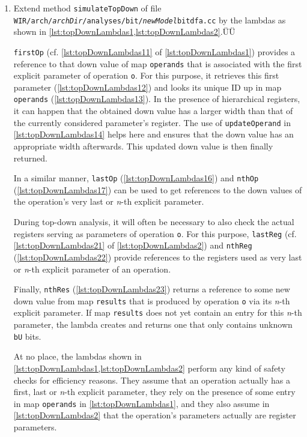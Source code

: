 \begin{enumerate}[resume]
  \item Extend method \texttt{simulateTopDown} of file \texttt{WIR/arch/{\itshape archDir}/analyses/bit/{\itshape newModel}bitdfa.cc} by the lambdas as shown in \cref{lst:topDownLambdas1,lst:topDownLambdas2}.Ü\label{enum:topDownLambdas}Ü

  \texttt{firstOp} (cf. \cref{lst:topDownLambdas11} of \cref{lst:topDownLambdas1}) provides a reference to that down value of map \texttt{operands} that is associated with the first explicit parameter of operation \texttt{o}.
  For this purpose, it retrieves this first parameter (\cref{lst:topDownLambdas12}) and looks its unique ID up in map \texttt{operands} (\cref{lst:topDownLambdas13}).
  In the presence of hierarchical registers, it can happen that the obtained down value has a larger width than that of the currently considered parameter's register.
  The use of \texttt{updateOperand} in \cref{lst:topDownLambdas14} helps here and ensures that the down value has an appropriate width afterwards.
  This updated down value is then finally returned.

  In a similar manner, \texttt{lastOp} (\cref{lst:topDownLambdas16}) and \texttt{nthOp} (\cref{lst:topDownLambdas17}) can be used to get references to the down values of the operation's very last or \emph{n}-th explicit parameter.

  During top-down analysis, it will often be necessary to also check the actual registers serving as parameters of operation \texttt{o}.
  For this purpose, \texttt{lastReg} (cf. \cref{lst:topDownLambdas21} of \cref{lst:topDownLambdas2}) and \texttt{nthReg} (\cref{lst:topDownLambdas22}) provide references to the registers used as very last or \emph{n}-th explicit parameter of an operation.

  Finally, \texttt{nthRes} (\cref{lst:topDownLambdas23}) returns a reference to some new down value from map \texttt{results} that is produced by operation \texttt{o} via its \emph{n}-th explicit parameter.
  If map \texttt{results} does not yet contain an entry for this \emph{n}-th parameter, the lambda creates and returns one that only contains unknown \texttt{bU} bits.
  \begin{wirWarn}
    At no place, the lambdas shown in \cref{lst:topDownLambdas1,lst:topDownLambdas2} perform any kind of safety checks for efficiency reasons.
    They assume that an operation actually has a first, last or \emph{n}-th explicit parameter, they rely on the presence of some entry in map \texttt{operands} in \cref{lst:topDownLambdas1}, and they also assume in \cref{lst:topDownLambdas2} that the operation's parameters actually are register parameters.


\end{wirWarn}
\end{enumerate}
